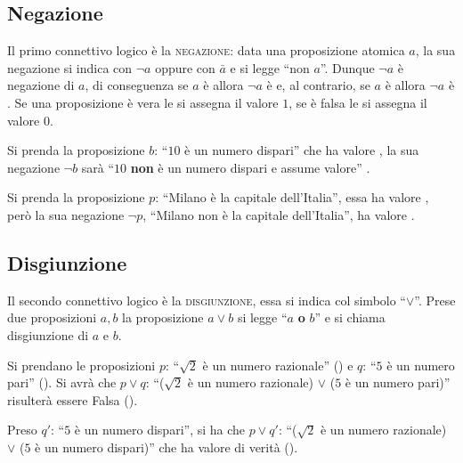 \subsection{Negazione}\label{subsec:negazione}
Il primo connettivo logico è la \textsc{negazione}: data una proposizione atomica \(a\), la sua negazione si indica con \(\neg{a}\) oppure con \(\bar{a}\) e si legge ``non \(a\)''. Dunque \(\neg{a}\) è negazione di \(a\), di conseguenza se \(a\) è \true[l]{} allora \(\neg{a}\) è \false[l]{} e, al contrario, se \(a\) è \false[l]{} allora \(\neg{a}\) è \true[l]{}. Se una proposizione è vera le si assegna il valore \(1\), se è falsa le si assegna il valore \(0\).



\begin{example}
    Si prenda la proposizione \(b\): ``\(10\) è un numero dispari'' che ha valore \false, la sua negazione \(\neg b\) sarà ``\(10\) \textbf{non} è un numero dispari e assume valore'' \true.
\end{example}

\begin{example}
    Si prenda la proposizione \(p\): ``Milano è la capitale dell'Italia'', essa ha valore \false, però la sua negazione \(\neg p\), ``Milano non è la capitale dell'Italia'', ha valore \true.
\end{example}


\subsection{Disgiunzione}\label{subsec:disgiunzione}
Il secondo connettivo logico è la \textsc{disgiunzione}, essa si indica col simbolo ``\(\lor\)''. Prese due proposizioni \(a, b\) la proposizione \(a \lor b\) si legge ``\(a\) \textbf{o} \(b\)'' e si chiama disgiunzione di \(a\) e \(b\).



\begin{example}
    Si prendano le proposizioni \(p\): ``\(\sqrt{2}\) è un numero razionale'' (\false) e \(q\): ``\(5\) è un numero pari'' (\false). Si avrà che \(p \lor q\): ``(\(\sqrt{2}\) è un numero razionale) \(\lor\) (\(5\) è un numero pari)'' risulterà essere Falsa (\false).

    Preso \(q'\): ``\(5\) è un numero dispari'', si ha che \(p \lor q'\): ``(\(\sqrt{2}\) è un numero razionale) \(\lor\) (\(5\) è un numero dispari)'' che ha valore di verità (\true).
\end{example}


